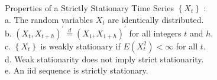 \begin{proposition}
	Properties of a Strictly Stationary Time Series $\left\{X_t\right\}$ :\\
a. The random variables $X_t$ are identically distributed.\\
b. $\left(X_t, X_{t+h}\right)^{\prime} \stackrel{d}{=}\left(X_1, X_{1+h}\right)^{\prime}$ for all integers $t$ and $h$.\\
c. $\left\{X_t\right\}$ is weakly stationary if $E\left(X_t^2\right)<\infty$ for all $t$.\\
d. Weak stationarity does not imply strict stationarity.\\
e. An iid sequence is strictly stationary.
\end{proposition}
